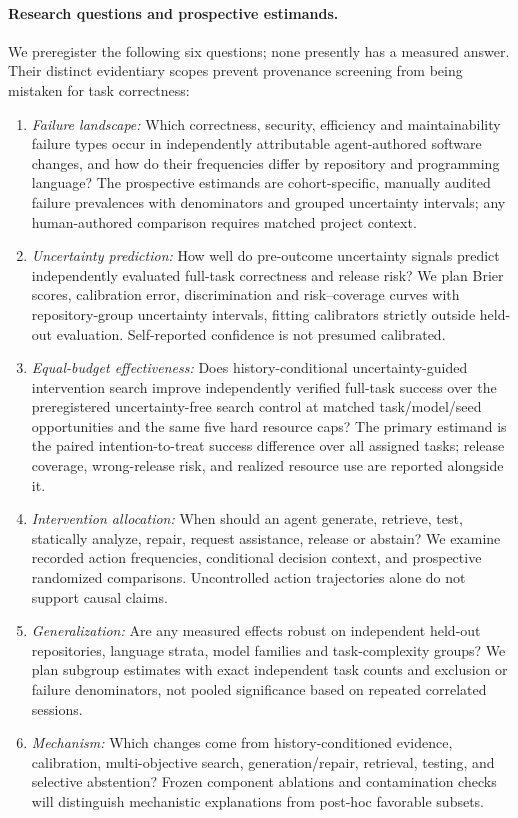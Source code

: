 \documentclass[pdflatex,sn-basic]{sn-jnl}
\begin{document}
\paragraph{Research questions and prospective estimands.}
We preregister the following six questions; none presently has
a measured answer. Their distinct evidentiary scopes prevent
provenance screening from being mistaken for task correctness:
\begin{enumerate}
\item[\textbf{RQ1.}] \emph{Failure landscape:} Which
correctness, security, efficiency and maintainability failure
types occur in independently attributable agent-authored
software changes, and how do their frequencies differ by
repository and programming language? The prospective estimands
are cohort-specific, manually audited failure prevalences
with denominators and grouped uncertainty intervals; any
human-authored comparison requires matched project context.
\item[\textbf{RQ2.}] \emph{Uncertainty prediction:} How well
do pre-outcome uncertainty signals predict independently
evaluated full-task correctness and release risk? We plan
Brier scores, calibration error, discrimination and
risk--coverage curves with repository-group uncertainty
intervals, fitting calibrators strictly outside held-out
evaluation. Self-reported confidence is not presumed calibrated.
\item[\textbf{RQ3.}] \emph{Equal-budget effectiveness:}
Does history-conditional uncertainty-guided intervention
search improve independently verified full-task success over
the preregistered uncertainty-free search control at matched
task/model/seed opportunities and the same five hard resource
caps? The primary estimand is the paired
intention-to-treat success difference over all assigned tasks;
release coverage, wrong-release risk, and realized resource
use are reported alongside it.
\item[\textbf{RQ4.}] \emph{Intervention allocation:}
When should an agent generate, retrieve, test, statically
analyze, repair, request assistance, release or abstain?
We examine recorded action frequencies, conditional
decision context, and prospective randomized comparisons.
Uncontrolled action trajectories alone do not support
causal claims.
\item[\textbf{RQ5.}] \emph{Generalization:} Are any
measured effects robust on independent held-out repositories,
language strata, model families and task-complexity groups?
We plan subgroup estimates with exact independent task
counts and exclusion or failure denominators, not pooled
significance based on repeated correlated sessions.
\item[\textbf{RQ6.}] \emph{Mechanism:} Which changes
come from history-conditioned evidence, calibration,
multi-objective search, generation/repair, retrieval,
testing, and selective abstention? Frozen component
ablations and contamination checks will distinguish
mechanistic explanations from post-hoc favorable subsets.
\end{enumerate}
\end{document}
